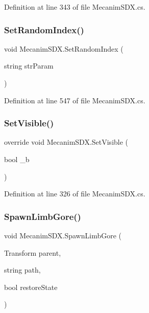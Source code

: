 Definition at line 343 of file Mecanim\+S\+D\+X.\+cs.

\mbox{\label{class_mecanim_s_d_x_aabbcbe845bba261cc773a988289ade7a}} 
\subsubsection{\texorpdfstring{SetRandomIndex()}{SetRandomIndex()}}
{\footnotesize\ttfamily void Mecanim\+S\+D\+X.\+Set\+Random\+Index (\begin{DoxyParamCaption}\item[{string}]{str\+Param }\end{DoxyParamCaption})}



Definition at line 547 of file Mecanim\+S\+D\+X.\+cs.

\mbox{\label{class_mecanim_s_d_x_a454125391067d3ee2716a87bad981cb1}} 
\subsubsection{\texorpdfstring{SetVisible()}{SetVisible()}}
{\footnotesize\ttfamily override void Mecanim\+S\+D\+X.\+Set\+Visible (\begin{DoxyParamCaption}\item[{bool}]{\+\_\+b }\end{DoxyParamCaption})}



Definition at line 326 of file Mecanim\+S\+D\+X.\+cs.

\mbox{\label{class_mecanim_s_d_x_a97268113d10542bb47b9da96c0e094cb}} 
\subsubsection{\texorpdfstring{SpawnLimbGore()}{SpawnLimbGore()}}
{\footnotesize\ttfamily void Mecanim\+S\+D\+X.\+Spawn\+Limb\+Gore (\begin{DoxyParamCaption}\item[{Transform}]{parent,  }\item[{string}]{path,  }\item[{bool}]{restore\+State }\end{DoxyParamCaption})\hspace{0.3cm}{\ttfamily [protected]}}



